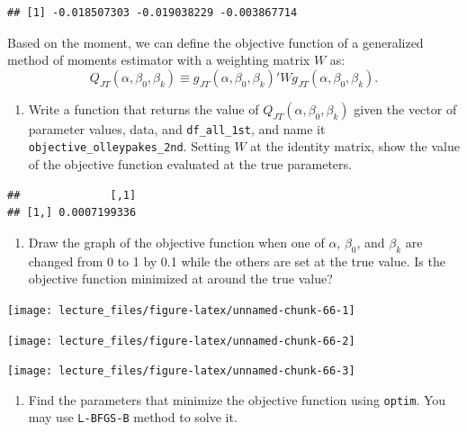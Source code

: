 \documentclass[
]{book}
\providecommand{\tightlist}{%
  \setlength{\itemsep}{0pt}\setlength{\parskip}{0pt}}
\begin{document}
\begin{verbatim}
## [1] -0.018507303 -0.019038229 -0.003867714
\end{verbatim}

Based on the moment, we can define the objective function of a generalized method of moments estimator with a weighting matrix \(W\) as:
\[
Q_{JT}(\alpha, \beta_0, \beta_k) \equiv g_{JT}(\alpha, \beta_0, \beta_k)' W g_{JT}(\alpha, \beta_0, \beta_k).
\]

\begin{enumerate}
\def\labelenumi{\arabic{enumi}.}
\setcounter{enumi}{6}
\tightlist
\item
  Write a function that returns the value of \(Q_{JT}(\alpha, \beta_0, \beta_k)\) given the vector of parameter values, data, and \texttt{df\_all\_1st}, and name it \texttt{objective\_olleypakes\_2nd}. Setting \(W\) at the identity matrix, show the value of the objective function evaluated at the true parameters.
\end{enumerate}

\begin{verbatim}
##              [,1]
## [1,] 0.0007199336
\end{verbatim}

\begin{enumerate}
\def\labelenumi{\arabic{enumi}.}
\setcounter{enumi}{7}
\tightlist
\item
  Draw the graph of the objective function when one of \(\alpha\), \(\beta_0\), and \(\beta_k\) are changed from 0 to 1 by 0.1 while the others are set at the true value. Is the objective function minimized at around the true value?
\end{enumerate}

\begin{center}\texttt{[image: lecture\_files/figure-latex/unnamed-chunk-66-1]} \end{center}

\begin{center}\texttt{[image: lecture\_files/figure-latex/unnamed-chunk-66-2]} \end{center}

\begin{center}\texttt{[image: lecture\_files/figure-latex/unnamed-chunk-66-3]} \end{center}

\begin{enumerate}
\def\labelenumi{\arabic{enumi}.}
\setcounter{enumi}{8}
\tightlist
\item
  Find the parameters that minimize the objective function using \texttt{optim}. You may use \texttt{L-BFGS-B} method to solve it.
\end{enumerate}
\end{document}
